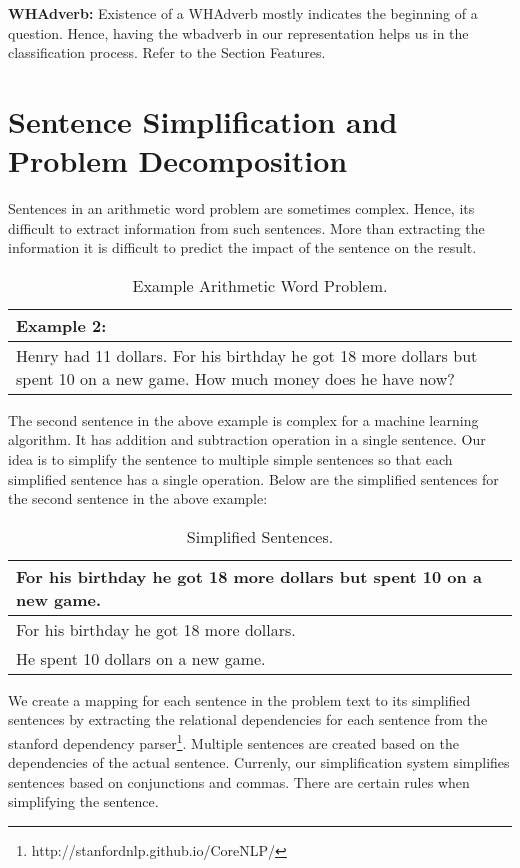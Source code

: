 \documentclass[11pt]{article}
\begin{document}
\textbf{WHAdverb:} Existence of a WHAdverb mostly indicates the beginning of a question. Hence, having the wbadverb in our representation helps us in the classification process. Refer to the Section Features.

\section{Sentence Simplification and Problem Decomposition}
Sentences in an arithmetic word problem are sometimes complex. Hence, its difficult to extract information from such sentences. More than extracting the information it is difficult to predict the impact of the sentence on the result. 

\begin{table}[h!]
\centering
\begin{tabular}{ | m{25em} | }
\hline
Example 2:\\
\hline
Henry had 11 dollars. For his birthday he got 18 more dollars but spent 10 on a new game. How much money does he have now?\\
\hline
\end{tabular}
\caption{Example Arithmetic Word Problem.}
\label{table:2}
\end{table}

The second sentence in the above example is complex for a machine learning algorithm. It has addition and subtraction operation in a single sentence. Our idea is to simplify the sentence to multiple simple sentences so that each simplified sentence has a single operation. Below are the simplified sentences for the second sentence in the above example:

\begin{table}[h!]
\centering
\begin{tabular}{ | m{25em} | }
\hline
 \textbf{For his birthday he got 18 more dollars but spent 10 on a new game.}\\
\hline
 For his birthday he got 18 more dollars.\\
\hline
He spent 10 dollars on a new game.\\
\hline
\end{tabular}
\caption{Simplified Sentences.}
\label{table:3}
\end{table}

We create a mapping for each sentence in the problem text to its simplified sentences by extracting the relational dependencies for each sentence from the stanford dependency parser\footnote{http://stanfordnlp.github.io/CoreNLP/ }. Multiple sentences are created based on the dependencies of the actual sentence. Currenly, our simplification system simplifies sentences based on conjunctions and commas. There are certain rules when simplifying the sentence.
\end{document}
